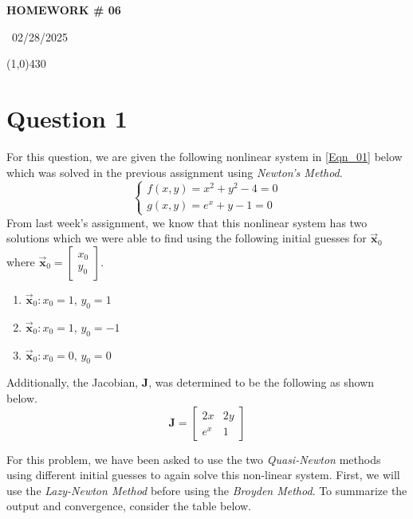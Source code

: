 \documentclass{article}
\begin{document}
\begin{center}
 \LARGE\bfseries HOMEWORK \# 06
\end{center}
\begin{center}
    ~02/28/2025~
\end{center}
 \line(1,0){430}

\section{Question 1}
For this question, we are given the following nonlinear system in \ref{Eqn_01} below which was solved in the previous assignment using \textit{Newton's Method}.
\begin{equation}
    \label{Eqn_01}
    \begin{cases}
        f(x,y) = x^2+y^2-4 = 0 \\
        g(x,y) = e^x + y -1 = 0
    \end{cases}
\end{equation}
From last week's assignment, we know that this nonlinear system has two solutions which we were able to find using the following initial guesses for \(\mathbf{\Vec{x}}_0\) where \(\mathbf{\Vec{x}}_0 = \begin{bmatrix}
    x_0 \\
    y_0
\end{bmatrix} \).
\begin{enumerate}
    \item \(\mathbf{\Vec{x}}_0 : x_0 =1\), \(y_0=1\)
    \item \(\mathbf{\Vec{x}}_0 :x_0 =1\), \(y_0=-1\)
    \item \(\mathbf{\Vec{x}}_0 :x_0 =0\), \(y_0=0\)
\end{enumerate}
Additionally, the Jacobian, \(\mathbf{J}\), was determined to be the following as shown below.
\[\mathbf{J} = 
\begin{bmatrix}
    2x & 2y \\
    e^x & 1
\end{bmatrix}
\]

For this problem, we have been asked to use the two \textit{Quasi-Newton} methods using different initial guesses to again solve this non-linear system. First, we will use the \textit{Lazy-Newton Method} before using the \textit{Broyden Method}. To summarize the output and convergence, consider the table below.
\end{document}
